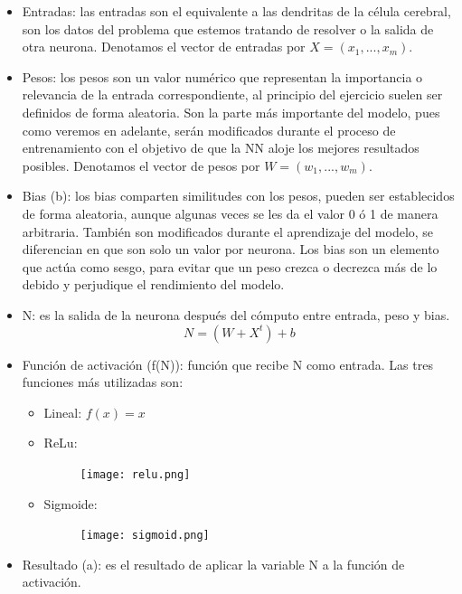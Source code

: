 \documentclass[a4paper,10pt]{article}
\begin{document}
\begin{itemize}
    \item Entradas: las entradas son el equivalente a las dendritas de la célula cerebral, son los datos del problema que estemos tratando de resolver o la salida de otra neurona. Denotamos el vector de entradas por $X=(x_1,...,x_m)$.
    \item Pesos: los pesos son un valor numérico que representan la importancia o relevancia de la entrada correspondiente, al principio del ejercicio suelen ser definidos de forma aleatoria. Son la parte más importante del modelo, pues como veremos en adelante, serán modificados durante el proceso de entrenamiento con el objetivo de que la NN aloje los mejores resultados posibles. Denotamos el vector de pesos por $W=(w_1,...,w_m)$.
    \item Bias (b): los bias comparten similitudes con los pesos, pueden ser establecidos de forma aleatoria, aunque algunas veces se les da el valor 0 ó 1 de manera arbitraria. También son modificados durante el aprendizaje del modelo, se diferencian en que son solo un valor por neurona. Los bias son un elemento que actúa como sesgo, para evitar que un peso crezca o decrezca más de lo debido y perjudique el rendimiento del modelo.
    \item N: es la salida de la neurona después del cómputo entre entrada, peso y bias.\\                                           \[N=(W+X^t)+b\]
    \item Función de activación (f(N)): función que recibe N como entrada. Las tres funciones más utilizadas son:
    \begin{itemize}
    \item Lineal: $f(x)=x$ 
    \item ReLu: 		\begin{figure}[H]
				\centering
				\texttt{[image: relu.png]}
				\end{figure}
    \item Sigmoide: 	\begin{figure}[H]
				\centering
				\texttt{[image: sigmoid.png]}
				\end{figure}
	
    \end{itemize}
    \item Resultado (a): es el resultado de aplicar la variable N a la función de activación.
        
\end{itemize}
\end{document}
